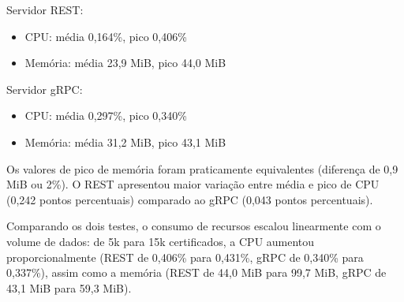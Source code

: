 Servidor REST:
\begin{itemize}
    \item CPU: média 0,164\%, pico 0,406\%
    \item Memória: média 23,9 MiB, pico 44,0 MiB
\end{itemize}

Servidor gRPC:
\begin{itemize}
    \item CPU: média 0,297\%, pico 0,340\%
    \item Memória: média 31,2 MiB, pico 43,1 MiB
\end{itemize}

Os valores de pico de memória foram praticamente equivalentes (diferença de 0,9 MiB ou 2\%). O REST apresentou maior variação entre média e pico de CPU (0,242 pontos percentuais) comparado ao gRPC (0,043 pontos percentuais).

Comparando os dois testes, o consumo de recursos escalou linearmente com o volume de dados: de 5k para 15k certificados, a CPU aumentou proporcionalmente (REST de 0,406\% para 0,431\%, gRPC de 0,340\% para 0,337\%), assim como a memória (REST de 44,0 MiB para 99,7 MiB, gRPC de 43,1 MiB para 59,3 MiB).
